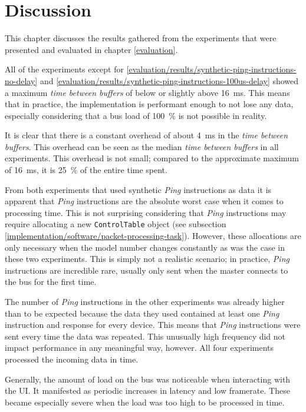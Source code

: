 \chapter{Discussion}
\label{discussion}

This chapter discusses the results gathered from the experiments that were presented and evaluated in
chapter \ref{evaluation}.
\bigbreak

All of the experiments except for \ref{evaluation/results/synthetic-ping-instructions-no-delay} and
\ref{evaluation/results/synthetic-ping-instructions-100us-delay} showed a maximum \textit{time between buffers}
of below or slightly above \SI{16}{\milli\second}. This means that in practice, the implementation is
performant enough to not lose any data, especially considering that a bus load of \SI{100}{\percent}
is not possible in reality.

It is clear that there is a constant overhead of about \SI{4}{\milli\second} in the
\textit{time between buffers}. This overhead can be seen as the median \textit{time between buffers}
in all experiments. This overhead is not small; compared to the approximate maximum of \SI{16}{\milli\second},
it is \SI{25}{\percent} of the entire time spent.

From both experiments that used synthetic \textit{Ping} instructions as data it is apparent that
\textit{Ping} instructions are the absolute worst case when it comes to processing time. This is
not surprising considering that \textit{Ping} instructions may require allocating a new
\lstinline{ControlTable} object (see subsection \ref{implementation/software/packet-processing-task}).
However, these allocations are only necessary when the model number changes constantly as was the case
in these two experiments. This is simply not a realistic scenario; in practice, \textit{Ping} instructions
are incredible rare, usually only sent when the master connects to the bus for the first time.

The number of \textit{Ping} instructions in the other experiments was already higher than to be expected
because the data they used contained at least one \textit{Ping} instruction and response for every device.
This means that \textit{Ping} instructions were sent every time the data was repeated. This unusually
high frequency did not impact performance in any meaningful way, however. All four experiments processed
the incoming data in time.

Generally, the amount of load on the bus was noticeable when interacting with the UI. It manifested
as periodic increases in latency and low framerate. These became especially severe when the load was
too high to be processed in time.


